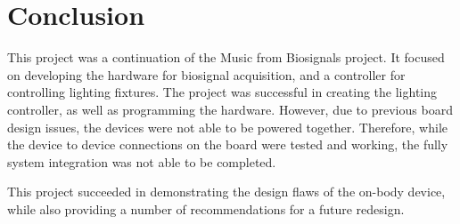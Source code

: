 \chapter{Conclusion}
This project was a continuation of the Music from Biosignals project.
It focused on developing the hardware for biosignal acquisition, and a controller for controlling lighting fixtures.
The project was successful in creating the lighting controller, as well as programming the hardware.
However, due to previous board design issues, the devices were not able to be powered together.
Therefore, while the device to device connections on the board were tested and working,
the fully system integration was not able to be completed.

This project succeeded in demonstrating the design flaws of the on-body device, while also providing a number of recommendations for a future redesign.

